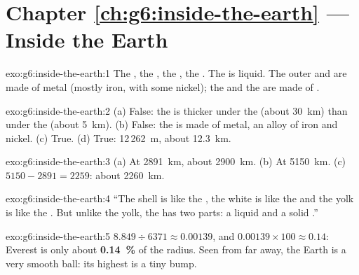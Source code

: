 \section*{Chapter \ref{ch:g6:inside-the-earth} --- Inside the Earth}

\begin{solution}{exo:g6:inside-the-earth:1}
The , the , the , the . The  is
liquid. The outer and  are made of metal (mostly iron, with some
nickel); the  and the  are made of .
\end{solution}

\begin{solution}{exo:g6:inside-the-earth:2}
(a) False: the  is thicker under the  (about 30~km) than
under the  (about 5~km). (b) False: the  is made of metal, an
alloy of iron and nickel. (c) True. (d) True: 12\,262~m, about 12.3~km.
\end{solution}

\begin{solution}{exo:g6:inside-the-earth:3}
(a) At 2891~km, about 2900~km. (b) At 5150~km. (c) $5150 - 2891 = 2259$:
about 2260~km.
\end{solution}

\begin{solution}{exo:g6:inside-the-earth:4}
``The shell is like the \underline{}, the white is like the
\underline{} and the yolk is like the \underline{}. But unlike the
yolk, the \underline{} has two parts: a liquid \underline{}
and a solid \underline{}.''
\end{solution}

\begin{solution}{exo:g6:inside-the-earth:5}
$8.849 \div 6371 \approx 0.00139$, and $0.00139 \times 100 \approx 0.14$:
Everest is only about \textbf{0.14~\%} of the radius. Seen from far away,
the Earth is a very smooth ball: its highest  is a tiny bump.
\end{solution}

